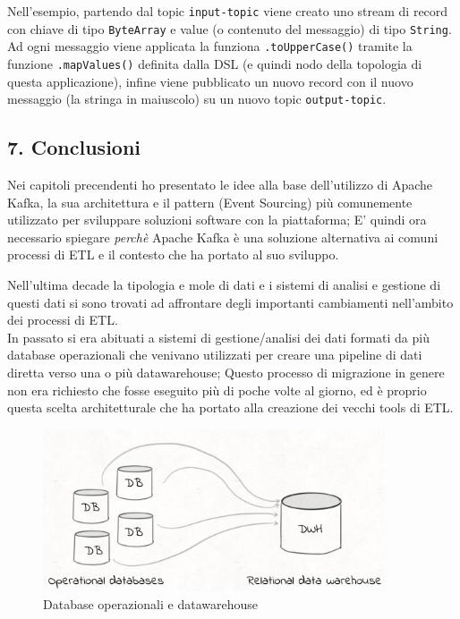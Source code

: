 \documentclass[]{article}
\begin{document}
Nell'esempio, partendo dal topic \texttt{input-topic} viene creato uno
stream di record con chiave di tipo \texttt{ByteArray} e value (o
contenuto del messaggio) di tipo \texttt{String}.\\
Ad ogni messaggio viene applicata la funziona \texttt{.toUpperCase()}
tramite la funzione \texttt{.mapValues()} definita dalla DSL (e quindi
nodo della topologia di questa applicazione), infine viene pubblicato un
nuovo record con il nuovo messaggio (la stringa in maiuscolo) su un
nuovo topic \texttt{output-topic}.

\normalsize

\newpage

\subsection{7. Conclusioni}\label{conclusioni}

Nei capitoli precendenti ho presentato le idee alla base dell'utilizzo
di Apache Kafka, la sua architettura e il pattern (Event Sourcing) più
comunemente utilizzato per sviluppare soluzioni software con la
piattaforma; E' quindi ora necessario spiegare \emph{perchè} Apache
Kafka è una soluzione alternativa ai comuni processi di ETL e il
contesto che ha portato al suo sviluppo.

Nell'ultima decade la tipologia e mole di dati e i sistemi di analisi e
gestione di questi dati si sono trovati ad affrontare degli importanti
cambiamenti nell'ambito dei processi di ETL.\\
In passato si era abituati a sistemi di gestione/analisi dei dati
formati da più database operazionali che venivano utilizzati per creare
una pipeline di dati diretta verso una o più datawarehouse; Questo
processo di migrazione in genere non era richiesto che fosse eseguito
più di poche volte al giorno, ed è proprio questa scelta architetturale
che ha portato alla creazione dei vecchi tools di ETL.

\begin{figure}
\centering
\includegraphics[width=0.90000\textwidth]{../images/op-dwh.png}
\caption{Database operazionali e datawarehouse \label{figure_5}}
\end{figure}
\end{document}
